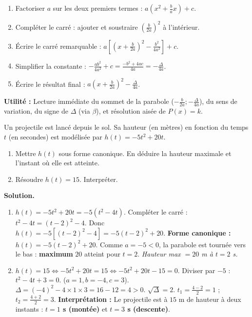 \documentclass[11pt]{article}
\begin{document}
\begin{methode}
    \begin{enumerate}
        \item Factoriser $a$ sur les deux premiers termes : $a\left(x^2+\frac{b}{a}x\right)+c$.
        \item Compléter le carré : ajouter et soustraire $\left(\frac{b}{2a}\right)^2$ à l'intérieur.
        \item Écrire le carré remarquable : $a\left[\left(x+\frac{b}{2a}\right)^2 - \frac{b^2}{4a^2}\right]+c$.
        \item Simplifier la constante : $-\frac{ab^2}{4a^2}+c = \frac{-b^2+4ac}{4a} = -\frac{\Delta}{4a}$.
        \item Écrire le résultat final : $a\left(x+\frac{b}{2a}\right)^2 - \frac{\Delta}{4a}$.
    \end{enumerate}
    \textbf{Utilité :} Lecture immédiate du sommet de la parabole ($-\frac{b}{2a}; -\frac{\Delta}{4a}$), du sens de variation, du signe de $\Delta$ (via $\beta$), et résolution aisée de $P(x)=k$.
\end{methode}

\begin{exoresolu}
    Un projectile est lancé depuis le sol. Sa hauteur (en mètres) en fonction du temps $t$ (en secondes) est modélisée par $h(t)=-5t^2+20t$.
    \begin{enumerate}
        \item Mettre $h(t)$ sous forme canonique. En déduire la hauteur maximale et l'instant où elle est atteinte.
        \item Résoudre $h(t)=15$. Interpréter.
    \end{enumerate}
    \tcblower
    \textbf{Solution.}
    \begin{enumerate}
        \item $h(t)=-5t^2+20t = -5(t^2-4t)$.
        Compléter le carré : $t^2-4t = (t-2)^2 - 4$.
        Donc $h(t) = -5\left[(t-2)^2 - 4\right] = -5(t-2)^2 + 20$.
        \textbf{Forme canonique :} $h(t) = -5(t-2)^2 + 20$.
        Comme $a=-5<0$, la parabole est tournée vers le bas : \textbf{maximum} $20$ atteint pour $t=2$.
        \textit{Hauteur max $= 20$ m à $t=2$ s.}
        \item $h(t)=15 \iff -5t^2+20t=15 \iff -5t^2+20t-15=0$.
        Diviser par $-5$ : $t^2-4t+3=0$. ($a=1, b=-4, c=3$).
        $\Delta = (-4)^2 - 4\times 1 \times 3 = 16-12=4 > 0$.
        $\sqrt{\Delta}=2$.
        $t_1 = \frac{4-2}{2}=1$ ; $t_2 = \frac{4+2}{2}=3$.
        \textbf{Interprétation :} Le projectile est à $15$ m de hauteur à deux instants : \textbf{$t=1$ s (montée)} et \textbf{$t=3$ s (descente)}.
    \end{enumerate}
\end{exoresolu}
\end{document}
